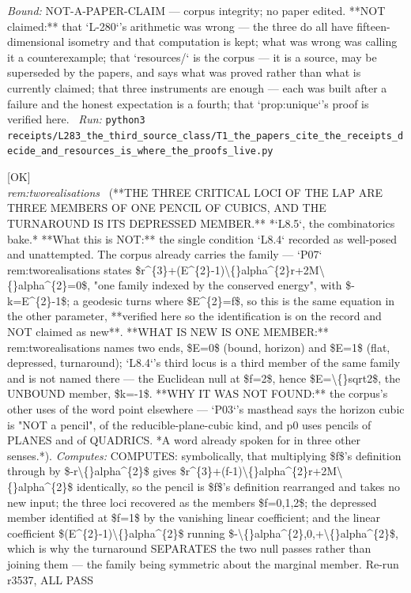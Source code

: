 \begin{description}
 \emph{Bound:} NOT-A-PAPER-CLAIM --- corpus integrity; no paper edited. **NOT claimed:** that `L-280`'s arithmetic was wrong --- the three do all have fifteen-dimensional isometry and that computation is kept; what was wrong was calling it a counterexample; that `resources/` is the corpus --- it is a source, may be superseded by the papers, and says what was proved rather than what is currently claimed; that three instruments are enough --- each was built after a failure and the honest expectation is a fourth; that `prop:unique`'s proof is verified here.
\ \emph{Run:} \texttt{python3 receipts/L283\_the\_third\_source\_class/T1\_the\_papers\_cite\_the\_receipts\_decide\_and\_resources\_is\_where\_the\_proofs\_live.py}
\item[\label{rcpt:L8_the_pencil}\texttt{L8\_the\_pencil}]\hfill\textsf{[OK]}\\
\textit{rem:tworealisations} \ (**THE THREE CRITICAL LOCI OF THE LAP ARE THREE MEMBERS OF ONE PENCIL OF CUBICS, AND THE TURNAROUND IS ITS DEPRESSED MEMBER.** *`L8.5`, the combinatorics bake.* **What this is NOT:** the single condition `L8.4` recorded as well-posed and unattempted. The corpus already carries the family --- `P07` rem:tworealisations states \$r\textasciicircum{}\{3\}+(E\textasciicircum{}\{2\}-1)\textbackslash\{\}alpha\textasciicircum{}\{2\}r+2M\textbackslash\{\}alpha\textasciicircum{}\{2\}=0\$, "one family indexed by the conserved energy", with \$-k=E\textasciicircum{}\{2\}-1\$; a geodesic turns where \$E\textasciicircum{}\{2\}=f\$, so this is the same equation in the other parameter, **verified here so the identification is on the record and NOT claimed as new**. **WHAT IS NEW IS ONE MEMBER:** rem:tworealisations names two ends, \$E=0\$ (bound, horizon) and \$E=1\$ (flat, depressed, turnaround); `L8.4`'s third locus is a third member of the same family and is not named there --- the Euclidean null at \$f=2\$, hence \$E=\textbackslash\{\}sqrt2\$, the UNBOUND member, \$k=-1\$. **WHY IT WAS NOT FOUND:** the corpus's other uses of the word point elsewhere --- `P03`'s masthead says the horizon cubic is "NOT a pencil", of the reducible-plane-cubic kind, and p0 uses pencils of PLANES and of QUADRICS. *A word already spoken for in three other senses.*). 
\emph{Computes:} COMPUTES: symbolically, that multiplying \$f\$'s definition through by \$-r\textbackslash\{\}alpha\textasciicircum{}\{2\}\$ gives \$r\textasciicircum{}\{3\}+(f-1)\textbackslash\{\}alpha\textasciicircum{}\{2\}r+2M\textbackslash\{\}alpha\textasciicircum{}\{2\}\$ identically, so the pencil is \$f\$'s definition rearranged and takes no new input; the three loci recovered as the members \$f=0,1,2\$; the depressed member identified at \$f=1\$ by the vanishing linear coefficient; and the linear coefficient \$(E\textasciicircum{}\{2\}-1)\textbackslash\{\}alpha\textasciicircum{}\{2\}\$ running \$-\textbackslash\{\}alpha\textasciicircum{}\{2\},0,+\textbackslash\{\}alpha\textasciicircum{}\{2\}\$, which is why the turnaround SEPARATES the two null passes rather than joining them --- the family being symmetric about the marginal member. Re-run r3537, ALL PASS

\end{description}
